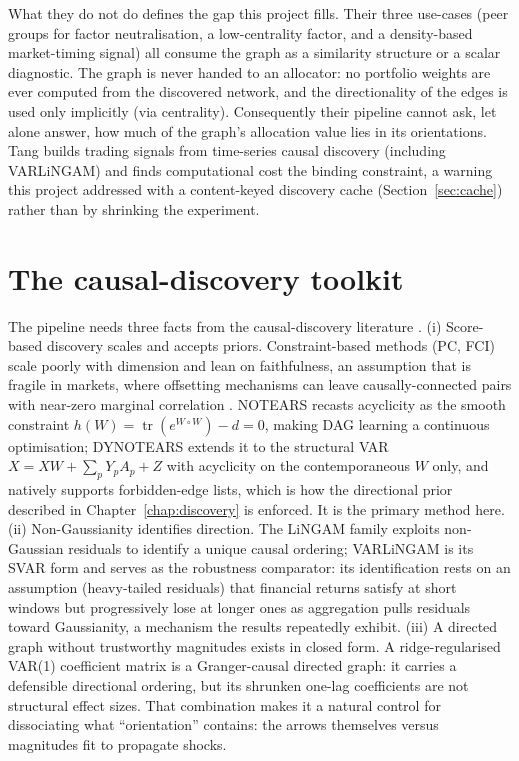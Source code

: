 What they do not do defines the gap this project fills. Their three
use-cases (peer groups for factor neutralisation, a low-centrality factor,
and a density-based market-timing signal) all consume the graph as a
similarity structure or a scalar diagnostic. The graph is never handed to an
allocator: no portfolio weights are ever computed from the discovered
network, and the directionality of the edges is used only implicitly (via
centrality). Consequently their pipeline cannot ask, let alone answer, how
much of the graph's allocation value lies in its orientations. Tang
\cite{tang2024trading} builds trading signals from time-series causal
discovery (including VARLiNGAM) and finds computational cost the binding
constraint, a warning this project addressed with a content-keyed discovery
cache (Section~\ref{sec:cache}) rather than by shrinking the experiment.

\section{The causal-discovery toolkit}
\label{sec:cd-tools}

The pipeline needs three facts from the causal-discovery literature
\cite{spirtes2000causation,kaddour2022causalml}. (i) Score-based
discovery scales and accepts priors. Constraint-based methods (PC, FCI)
scale poorly with dimension and lean on faithfulness, an assumption that is
fragile in markets,
where offsetting mechanisms can leave causally-connected pairs with near-zero
marginal correlation \cite{howard2025causal}. NOTEARS \cite{zheng2018notears}
recasts acyclicity as the smooth constraint
$h(W)=\operatorname{tr}(e^{W\circ W})-d=0$, making DAG learning a continuous
optimisation; DYNOTEARS \cite{pamfil2020dynotears} extends it to the
structural VAR $X = XW + \sum_p Y_p A_p + Z$ with acyclicity on the
contemporaneous $W$ only, and natively supports forbidden-edge lists, which
is how the directional prior described in Chapter~\ref{chap:discovery} is
enforced. It is the primary method
here.
(ii) Non-Gaussianity identifies direction. The LiNGAM family
\cite{shimizu2006lingam} exploits non-Gaussian residuals to identify a unique
causal ordering; VARLiNGAM \cite{hyvarinen2010varlingam} is its SVAR form and
serves as the robustness comparator: its identification rests on an
assumption (heavy-tailed residuals) that financial returns satisfy at short
windows but progressively lose at longer ones as aggregation pulls residuals
toward Gaussianity, a mechanism the results repeatedly exhibit.
(iii) A directed graph without trustworthy magnitudes exists in
closed form. A ridge-regularised VAR(1) coefficient matrix is a
Granger-causal \cite{granger1969investigating} directed graph: it carries a
defensible directional ordering, but its shrunken one-lag
coefficients are not structural effect sizes. That combination makes it a
natural control for dissociating what ``orientation'' contains: the
arrows themselves versus magnitudes fit to propagate shocks.

